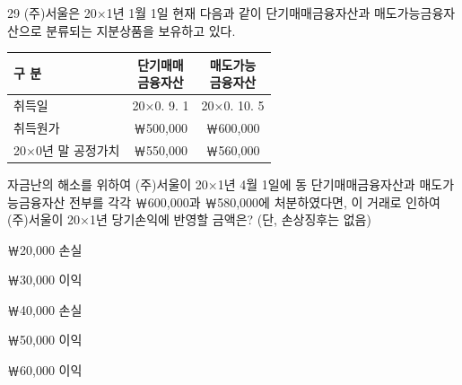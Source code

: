 \begin{question}{29}
(주)서울은 20×1년 1월 1일 현재 다음과 같이 단기매매금융자산과 매도가능금융자산으로 분류되는 지분상품을 보유하고 있다.

{\small\centering
\begin{tabular}{|l|c|c|}
\hline
구 분 & \makecell{단기매매\\금융자산} & \makecell{매도가능\\금융자산} \\
\hline
취득일 & 20×0. 9. 1 & 20×0. 10. 5 \\
\hline
취득원가 & ￦500,000 & ￦600,000 \\
\hline
20×0년 말 공정가치 & ￦550,000 & ￦560,000 \\
\hline
\end{tabular}\par}

자금난의 해소를 위하여 (주)서울이 20×1년 4월 1일에 동 단기매매금융자산과 매도가능금융자산 전부를 각각 ￦600,000과 ￦580,000에 처분하였다면, 이 거래로 인하여 (주)서울이 20×1년 당기손익에 반영할 금액은? (단, 손상징후는 없음) \par
\begin{choices}
  \item ￦20,000 손실
  \item ￦30,000 이익
  \item ￦40,000 손실
  \item ￦50,000 이익
  \item ￦60,000 이익
\end{choices}
\end{question}

